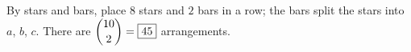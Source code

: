 By stars and bars, place $8$ stars and $2$ bars in a row; the bars split the stars into $a$, $b$, $c$. There are $\dbinom{10}{2}=\boxed{45}$ arrangements.
